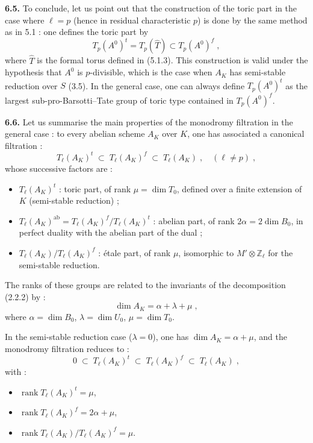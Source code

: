 \documentclass[11pt]{article}
\newcommand{\ZZ}{\mathbb Z}
\newcommand{\Tl}{T_{\ell}}
\newcommand{\Tp}{T_p}
\newcommand{\rang}{\operatorname{rank}}
\newcommand{\ab}{\mathrm{ab}}
\begin{document}
\medskip

\noindent\textbf{6.5.} To conclude, let us point out that the
construction of the toric part in the case where $\ell = p$ (hence in
residual characteristic $p$) is done by the same method as in 5.1 :
one defines the toric part by
\begin{equation}
\Tp(A^0)^t = \Tp(\hat{T}) \subset \Tp(A^0)^f \; ,
\end{equation}
where $\hat{T}$ is the formal torus defined in (5.1.3). This
construction is valid under the hypothesis that $A^0$ is
$p$-divisible, which is the case when $A_K$ has semi-stable reduction
over $S$ (3.5). In the general case, one can always define
$\Tp(A^0)^t$ as the largest sub-pro-Barsotti--Tate group of toric type
contained in $\Tp(A^0)^f$.

\medskip

\noindent\textbf{6.6.} Let us summarise the main properties of the
monodromy filtration in the general case : to every abelian scheme
$A_K$ over $K$, one has associated a canonical filtration :
\begin{equation}
\Tl(A_K)^t \;\subset\; \Tl(A_K)^f \;\subset\; \Tl(A_K) \; ,
\quad (\ell \neq p) \; ,
\end{equation}
whose successive factors are :
\begin{itemize}
\item $\Tl(A_K)^t$ : toric part, of rank $\mu = \dim T_0$, defined
over a finite extension of $K$ (semi-stable reduction) ;
\item $\Tl(A_K)^{\ab} = \Tl(A_K)^f/\Tl(A_K)^t$ : abelian part, of
rank $2\alpha = 2\dim B_0$, in perfect duality with the abelian part
of the dual ;
\item $\Tl(A_K)/\Tl(A_K)^f$ : \'etale part, of rank $\mu$, isomorphic
to $M' \otimes \ZZ_{\ell}$ for the semi-stable reduction.
\end{itemize}

\smallskip

The ranks of these groups are related to the invariants of the
decomposition (2.2.2) by :
\begin{equation}
\dim A_K = \alpha + \lambda + \mu \; ,
\end{equation}
where $\alpha = \dim B_0$, $\lambda = \dim U_0$, $\mu = \dim T_0$.

In the semi-stable reduction case ($\lambda = 0$), one has
$\dim A_K = \alpha + \mu$, and the monodromy filtration reduces to :
\begin{equation}
0 \;\subset\; \Tl(A_K)^t \;\subset\; \Tl(A_K)^f \;\subset\;
\Tl(A_K) \; ,
\end{equation}
with :
\begin{itemize}
\item $\rang \Tl(A_K)^t = \mu$,
\item $\rang \Tl(A_K)^f = 2\alpha + \mu$,
\item $\rang \Tl(A_K)/\Tl(A_K)^f = \mu$.
\end{itemize}


\clearpage
\end{document}
